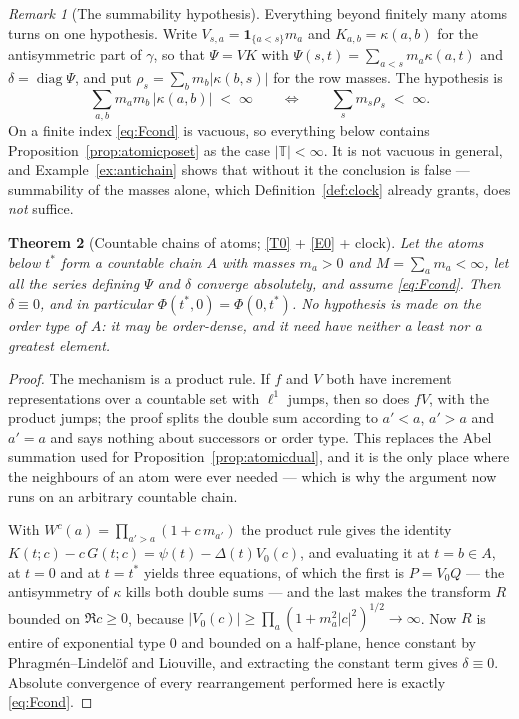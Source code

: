 \documentclass[11pt,a4paper]{article}
\theoremstyle{plain}
\newtheorem{theorem}{Theorem}[section]
\theoremstyle{definition}
\theoremstyle{remark}
\newtheorem{remark}[theorem]{Remark}
\newcommand{\T}{\mathbb{T}}                     %
\newcommand{\one}{\mathbf{1}}
\begin{document}
\begin{remark}[The summability hypothesis]
  \label{rem:Fcond}
  Everything beyond finitely many atoms turns on one hypothesis.  Write
  $V_{s,a} = \one_{\{a < s\}} m_a$ and $K_{a,b} = \kappa(a,b)$ for the
  antisymmetric part of $\gamma$, so that $\Psi = VK$ with
  $\Psi(s,t) = \sum_{a<s} m_a \kappa(a,t)$ and $\delta = \operatorname{diag}\Psi$,
  and put $\rho_s = \sum_b m_b |\kappa(b,s)|$ for the row masses.  The hypothesis is
  \begin{equation}
    \label{eq:Fcond}
    \sum_{a,b} m_a m_b \, |\kappa(a,b)| \;<\; \infty
    \qquad\Longleftrightarrow\qquad
    \sum_s m_s \rho_s \;<\; \infty .
    \tag{F}
  \end{equation}
  On a finite index \eqref{eq:Fcond} is vacuous, so everything below contains
  Proposition~\ref{prop:atomicposet} as the case $\lvert \T \rvert < \infty$.
  It is not vacuous in general, and Example~\ref{ex:antichain} shows that
  without it the conclusion is false --- summability of the masses alone,
  which Definition~\ref{def:clock} already grants, does \emph{not} suffice.
\end{remark}

\begin{theorem}[Countable chains of atoms; \eqref{T0} + \eqref{E0} + clock]
  \label{thm:densechain}
  Let the atoms below $t^*$ form a countable chain $A$ with masses $m_a > 0$ and
  $M = \sum_a m_a < \infty$, let all the series defining $\Psi$ and $\delta$
  converge absolutely, and assume \eqref{eq:Fcond}.  Then $\delta \equiv 0$, and
  in particular $\Phi(t^*,0) = \Phi(0,t^*)$.  No hypothesis is made on the order
  type of $A$: it may be order-dense, and it need have neither a least nor a
  greatest element.
\end{theorem}

\begin{proof}
  The mechanism is a product rule.  If $f$ and $V$ both have increment
  representations over a countable set with $\ell^1$ jumps, then so does $fV$,
  with the product jumps; the proof splits the double sum according to
  $a' < a$, $a' > a$ and $a' = a$ and says nothing about successors or order
  type.  This replaces the Abel summation used for
  Proposition~\ref{prop:atomicdual}, and it is the only place where the
  neighbours of an atom were ever needed --- which is why the argument now runs
  on an arbitrary countable chain.

  With $W^c(a) = \prod_{a' > a} (1 + c\,m_{a'})$ the product rule gives the
  identity $K(t;c) - c\,G(t;c) = \psi(t) - \Delta(t) V_0(c)$, and evaluating it
  at $t = b \in A$, at $t = 0$ and at $t = t^*$ yields three equations, of which
  the first is $P = V_0 Q$ --- the antisymmetry of $\kappa$ kills both double
  sums --- and the last makes the transform $R$ bounded on $\Re c \geq 0$,
  because $\lvert V_0(c)\rvert \geq \prod_a (1 + m_a^2 \lvert c\rvert^2)^{1/2}
  \to \infty$.  Now $R$ is entire of exponential type $0$ and bounded on a
  half-plane, hence constant by Phragmén--Lindelöf and Liouville, and extracting
  the constant term gives $\delta \equiv 0$.  Absolute convergence of every
  rearrangement performed here is exactly \eqref{eq:Fcond}.
\end{proof}
\end{document}

